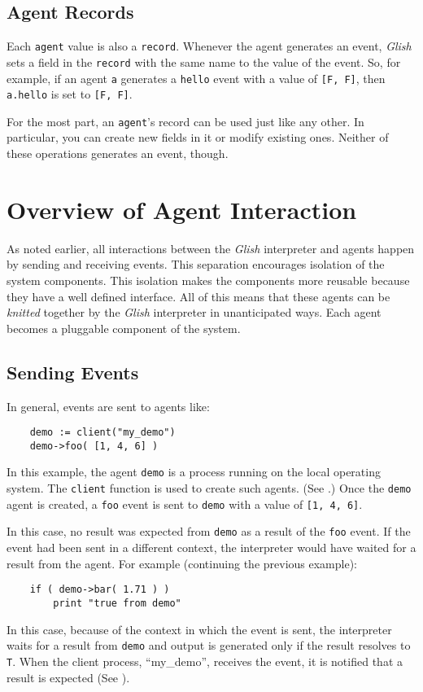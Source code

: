 \subsection{Agent Records}
\label{agent-record}

Each {\tt agent} value is also a {\tt record}.  Whenever the
agent generates an event, {\em Glish} sets a field in the {\tt record}
with the same name to the value of the event.  So, for example,
if an agent {\tt a} generates a {\tt hello} event with a value of
{\tt [F, F]}, then {\tt a.hello} is set to {\tt [F, F]}.

For the most part, an {\tt agent}'s 
record can be used just like any other.
In particular, you can create new fields in it or modify existing ones.
Neither of these operations generates an event, though.

\section{Overview of Agent Interaction}
\label{event-examples}

As noted earlier, all interactions between the {\em Glish} 
interpreter and agents
happen by sending and receiving events. This separation 
encourages isolation
of the system components. This isolation makes the components 
more reusable
because they have a well defined interface. All of this means that these
agents can be {\em knitted} together by the {\em Glish} 
interpreter in unanticipated
ways. Each agent becomes a pluggable component of the system.

\subsection{Sending Events}

In general, events are sent to agents like:
\begin{verbatim}
    demo := client("my_demo")
    demo->foo( [1, 4, 6] )
\end{verbatim}
In this example, the agent {\tt demo} is a process running on the
local operating system. The {\tt client} function is used to create
such agents. (See .)  Once the {\tt demo} agent is created,
a {\tt foo} event is sent to {\tt demo} with a value of {\tt [1, 4, 6]}.

In this case, no result was expected from {\tt demo} as a result of the
{\tt foo} event. If the event had been sent in a different context, the
interpreter would have waited for a result from the agent. For example
(continuing the previous example):
\begin{verbatim}
    if ( demo->bar( 1.71 ) )
        print "true from demo"
\end{verbatim}
In this case, because of the context in which the event is sent, the
interpreter waits for a result from {\tt demo} and output is generated
only if the result resolves to {\tt T}. When the client process, ``my\_demo'',
receives the event, it is notified that a result is expected
(See ).

